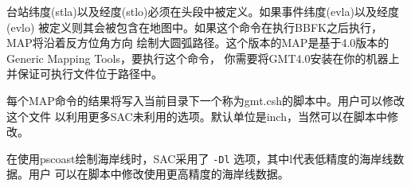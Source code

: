 台站纬度(stla)以及经度(stlo)必须在头段中被定义。如果事件纬度(evla)以及经度(evlo)
被定义则其会被包含在地图中。如果这个命令在执行BBFK之后执行，MAP将沿着反方位角方向
绘制大圆弧路径。这个版本的MAP是基于4.0版本的Generic Mapping Tools，要执行这个命令，
你需要将GMT4.0安装在你的机器上并保证可执行文件位于路径中。

每个MAP命令的结果将写入当前目录下一个称为gmt.csh的脚本中。用户可以修改这个文件
以利用更多SAC未利用的选项。默认单位是inch，当然可以在脚本中修改。

在使用pscoast绘制海岸线时，SAC采用了 \texttt{-Dl} 选项，其中l代表低精度的海岸线数据。用户
可以在脚本中修改使用更高精度的海岸线数据。

